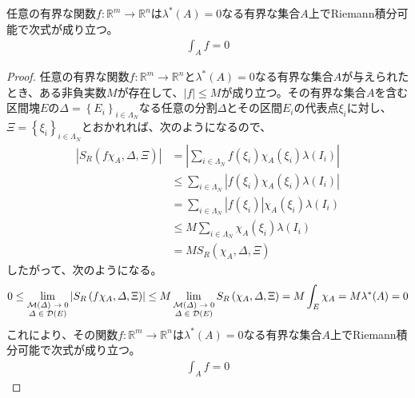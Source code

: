 \documentclass[dvipdfmx]{jsarticle}
\begin{document}
\begin{thm}\label{4.6.5.15}
任意の有界な関数$f:\mathbb{R}^{m} \rightarrow \mathbb{R}^{n}$は$\lambda^{*}(A) = 0$なる有界な集合$A$上でRiemann積分可能で次式が成り立つ。
\begin{align*}
\int_{A} f = 0
\end{align*}
\end{thm}
\begin{proof}
任意の有界な関数$f:\mathbb{R}^{m} \rightarrow \mathbb{R}^{n}$と$\lambda^{*}(A) = 0$なる有界な集合$A$が与えられたとき、ある非負実数$M$が存在して、$|f| \leq M$が成り立つ。その有界な集合$A$を含む区間塊$E$の$\varDelta = \left\{ E_{i} \right\}_{i \in \varLambda_{N}}$なる任意の分割$\varDelta$とその区間$E_{i}$の代表点$\xi_{i}$に対し、$\Xi = \left\{ \xi_{i} \right\}_{i \in \varLambda_{N}}$とおかれれば、次のようになるので、
\begin{align*}
\left| S_{R}\left( f\chi_{A},\varDelta,\Xi \right) \right| &= \left| \sum_{i \in \varLambda_{N}} {f\left( \xi_{i} \right)\chi_{A}\left( \xi_{i} \right)\lambda\left( I_{i} \right)} \right|\\
&\leq \sum_{i \in \varLambda_{N}} \left| f\left( \xi_{i} \right)\chi_{A}\left( \xi_{i} \right)\lambda\left( I_{i} \right) \right|\\
&= \sum_{i \in \varLambda_{N}} {\left| f\left( \xi_{i} \right) \right|\chi_{A}\left( \xi_{i} \right)\lambda\left( I_{i} \right)}\\
&\leq M\sum_{i \in \varLambda_{N}} {\chi_{A}\left( \xi_{i} \right)\lambda\left( I_{i} \right)}\\
&= MS_{R}\left( \chi_{A},\varDelta,\Xi \right)
\end{align*}
したがって、次のようになる。
\begin{align*}
0 \leq \lim_{\scriptsize \begin{matrix}
\mathcal{M}(\varDelta) \rightarrow 0 \\
\varDelta \in \mathcal{D}(E) \\
\end{matrix}}\left| S_{R}\left( f\chi_{A},\varDelta,\Xi \right) \right| \leq M\lim_{\scriptsize \begin{matrix}
\mathcal{M}(\varDelta) \rightarrow 0 \\
\varDelta \in \mathcal{D}(E) \\
\end{matrix}}{S_{R}\left( \chi_{A},\varDelta,\Xi \right)} = M\int_{E} \chi_{A} = M\lambda^{*}(A) = 0
\end{align*}
これにより、その関数$f:\mathbb{R}^{m} \rightarrow \mathbb{R}^{n}$は$\lambda^{*}(A) = 0$なる有界な集合$A$上でRiemann積分可能で次式が成り立つ。
\begin{align*}
\int_{A} f = 0
\end{align*}
\end{proof}
\end{document}
